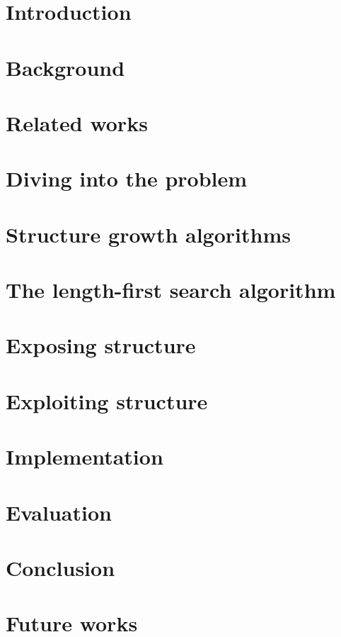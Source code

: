 \documentclass[titlepage]{report}
\begin{document}




\tableofcontents

\chapter{Introduction}


\chapter{Background}


\chapter{Related works}


\chapter{Diving into the problem}


\chapter{Structure growth algorithms}


\chapter{The length-first search algorithm}


\chapter{Exposing structure}


\chapter{Exploiting structure}


\chapter{Implementation}


\chapter{Evaluation}


\chapter{Conclusion}


\chapter{Future works}



\nocite{*} %


\end{document}

